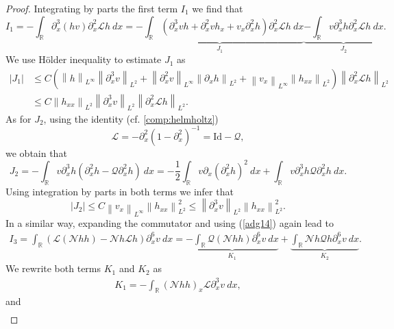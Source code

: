 \documentclass[10pt,a4paper]{amsart}
\newcommand{\RR}{\mathbb R}
\newcommand{\norm}[1]{\left\| #1 \right\|}
\newcommand{\pa}{\partial}
\begin{document}
\begin{proof}
Integrating by parts the first term $I_{1}$ we find that
\begin{equation*}
I_{1}=-\int_{\RR}\pa_{x}^{3}(hv)\pa_{x}^{2}\mathscr{L}h \ dx =\underbrace{-\int_{\RR}\left( \pa_{x}^{3}v h+ \pa_{x}^{2}vh_{x}+v_{x}\pa_{x}^{2}h \right)\pa_{x}^{2}\mathscr{L}h \ dx}_{J_{1}}\underbrace{-\int_{\RR}v\pa_{x}^{3}h \pa_{x}^{2}\mathscr{L}h \ dx}_{J_{2}} .
\end{equation*}
We use H\"older inequality to estimate $J_{1}$ as
\begin{align}\label{est:J1}
|J_{1}|&\leq C \left( \norm{h}_{L^{\infty}}\norm{\pa_{x}^{3}v}_{L^{2}}+\norm{\pa_{x}^{2}v}_{L^{\infty}}\norm{\pa_{x}h}_{L^{2}}+\norm{v_{x}}_{L^{\infty}}\norm{h_{xx}}_{L^{2}}\right)\norm{\pa_{x}^{2}\mathscr{L}h}_{L^{2}} \nonumber \\
& \leq C \norm{h_{xx}}_{L^{2}}\norm{\pa_{x}^{3}v}_{L^{2}}\norm{\pa_{x}^{2}\mathscr{L}h}_{L^{2}}.
\end{align}
As for $J_{2}$, using the identity (cf. \eqref{comp:helmholtz})
\begin{equation}\label{adg14}
\mathscr{L}=-\partial_{x}^2 (1-\pa_{x}^{2})^{-1}= \mathrm{Id}-\mathscr{Q},
\end{equation}
we obtain that
\begin{equation*}\label{rewrite:J2}
J_{2}=-\int_{\RR}v \pa_{x}^{3}h \left(\pa_{x}^{2}h-\mathscr{Q}\pa_{x}^{2}h\right) \ dx =- \frac{1}{2}\int_{\RR}v \pa_{x}(\pa_{x}^{2}h)^{2} \ dx + \int_{\RR}v \pa_{x}^{3}h \mathscr{Q}\pa_{x}^{2}h \ dx.
\end{equation*}
Using integration by parts in both terms we infer that
\begin{equation}\label{est:J2}
|J_{2}|\leq C \norm{v_{x}}_{L^{\infty}} \norm{h_{xx}}^{2}_{L^{2}}\leq \norm{\pa_{x}^{3}v}_{L^{2}} \norm{h_{xx}}^{2}_{L^{2}}.
\end{equation}
In a similar way, expanding the commutator and using (\ref{adg14}) again lead to
\begin{align*}
I_{3}=\int_{\RR} \left( \mathscr{L}(\mathscr{N}h h)-\mathscr{N}h\mathscr{L}h\right)\pa_{x}^{6}v \  dx=\underbrace{- \int_{\RR} \mathscr{Q}(\mathscr{N}h h)\pa_{x}^{6}v \  dx}_{K_{1}} +\underbrace{ \int_{\RR} \mathscr{N}h  \mathscr{Q}h \pa_{x}^{6}v \  dx}_{K_{2}}.
\end{align*}
We rewrite both terms $K_{1}$ and $K_{2}$ as
\begin{align*}
K_{1}= -\int_{\RR} (\mathscr{N}hh)_{x} \mathscr{L}\pa_{x}^{3}v \  dx,
\end{align*}
and
\begin{align*}

\end{align*}
\end{proof}
\end{document}
